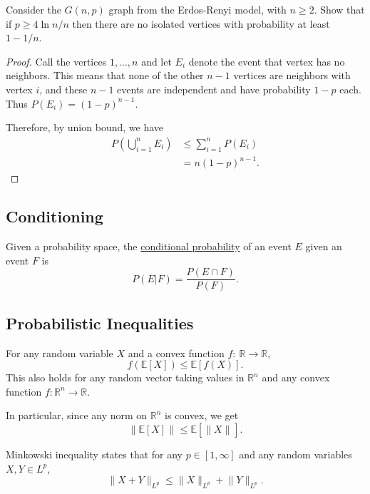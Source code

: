 \begin{example}
Consider the $G(n, p)$ graph from the Erdos-Renyi model, with $n \geq 2$. Show that if $p \geq 4 \ln{n}/n$ 
then there are no isolated vertices with probability at least $1 - 1/n$.
\end{example}

\begin{proof}
Call the vertices $1, \dots, n$ and let $E_i$ denote the event that vertex has no neighbors. This means that 
none of the other $n - 1$ vertices are neighbors with vertex $i$, and these $n - 1$ events are independent 
and have probability $1 - p$ each. Thus $P(E_i) = (1 - p)^{n - 1}$.

Therefore, by union bound, we have 
\begin{align*}
	P \left( \bigcup_{i = 1}^n E_i \right) 
	&\leq \sum_{i = 1}^{n} P(E_i) \\
	&= n(1 - p)^{n - 1}.
\end{align*}
\end{proof}


\subsection{Conditioning}

\begin{definition}[]
Given a probability space, the \underline{conditional probability} of an event $E$ given an event $F$ 
is 
\[ P(E|F) = \frac{P(E \cap F)}{P(F)}. \]
\end{definition}


\subsection{Probabilistic Inequalities}
\begin{theorem}
For any random variable $X$ and a convex function $f: \ \mathbb{R} \to \mathbb{R}$, 
\[ f(\mathbb{E}[X]) \leq \mathbb{E}[f(X)]. \]
This also holds for any random vector taking values in $\mathbb{R}^n$ and any convex function 
$f: \mathbb{R}^n \to \mathbb{R}$.
\end{theorem}
In particular, since any norm on $\mathbb{R}^n$ is convex, we get
\[ \lVert \mathbb{E}[X] \rVert_{} \leq \mathbb{E}[\lVert X \rVert_{}]. \]

\begin{theorem}
Minkowski inequality states that for any $p \in [1, \infty]$ and any random variables $X, Y \in L^p$, 
\[ \lVert X + Y \rVert_{L^p} \leq \lVert X \rVert_{L^p} + \lVert Y \rVert_{L^p}. \]
\end{theorem}


